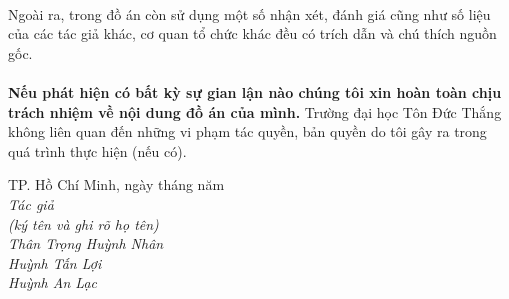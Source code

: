 \documentclass{report}
\newcommand\tab[1][1.25cm]{\hspace*{#1}}
\begin{document}
\paragraph{}
Ngoài ra, trong đồ án còn sử dụng một số nhận xét, đánh giá cũng như số liệu của các tác giả khác, cơ quan tổ chức khác đều có trích dẫn và chú thích nguồn gốc.
\paragraph{}
\textbf{Nếu phát hiện có bất kỳ sự gian lận nào chúng tôi xin hoàn toàn chịu trách nhiệm về nội dung đồ án của mình.} Trường đại học Tôn Đức Thắng không liên quan đến những vi phạm tác quyền, bản quyền do tôi gây ra trong quá trình thực hiện (nếu có).

\begin{flushright}
	TP. Hồ Chí Minh, ngày \tab[1cm] tháng \tab[1cm] năm \tab[1cm]\tab \\
	
	\textit{Tác giả \tab\tab\tab\tab\\
		(ký tên và ghi rõ họ tên)\tab[2cm] \\
		\vspace{1.5cm}
		Thân Trọng Huỳnh Nhân\tab\quad\tab\\
		\vspace{1.5cm}
		Huỳnh Tấn Lợi\tab\quad \tab\quad\\
		\vspace{1.5cm}
		Huỳnh An Lạc\tab\quad\tab\tab\\}

\end{flushright}
\pagebreak

\end{document}

